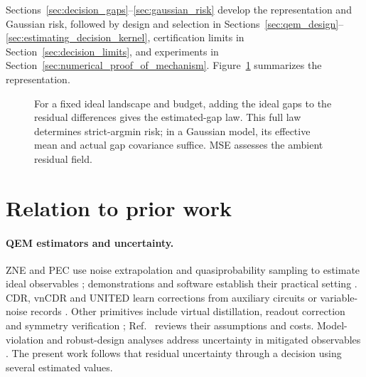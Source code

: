 \documentclass[a4paper,onecolumn,unpublished,nopdfoutputerror]{quantumarticle}
\theoremstyle{plain}
\theoremstyle{definition}
\newcommand{\1}{\mathbf{1}}
\begin{document}
Sections~\ref{sec:decision_gaps}--\ref{sec:gaussian_risk} develop the representation and Gaussian risk, followed by design and selection in Sections~\ref{sec:qem_design}--\ref{sec:estimating_decision_kernel}, certification limits in Section~\ref{sec:decision_limits}, and experiments in Section~\ref{sec:numerical_proof_of_mechanism}. Figure~\ref{fig:pipeline} summarizes the representation.

\begin{figure}[!ht]
    \centering
    \caption{For a fixed ideal landscape and budget, adding the ideal gaps to the residual differences gives the estimated-gap law. This full law determines strict-argmin risk; in a Gaussian model, its effective mean and actual gap covariance suffice. MSE assesses the ambient residual field.}
    \label{fig:pipeline}
\end{figure}


\section{Relation to prior work}

\paragraph{QEM estimators and uncertainty.}
ZNE and PEC use noise extrapolation and quasiprobability sampling to estimate ideal observables \cite{Temme2017,LiBenjamin2017,Endo2018}; demonstrations and software establish their practical setting \cite{Kandala2019,LaRose2022}. CDR, vnCDR and UNITED learn corrections from auxiliary circuits or variable-noise records \cite{Czarnik2021,Strikis2021,Lowe2021,Bultrini2023}. Other primitives include virtual distillation, readout correction and symmetry verification \cite{Huggins2021,Bravyi2021,BonetMonroig2018}; Ref.~\cite{Cai2023} reviews their assumptions and costs. Model-violation and robust-design analyses address uncertainty in mitigated observables \cite{Govia2025,Prodius2026}. The present work follows that residual uncertainty through a decision using several estimated values.
\end{document}
